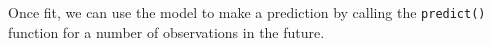 Once fit, we can use the model to make a prediction by calling the
\texttt{predict()} function for a number of observations in the future.

%
%
%
%

